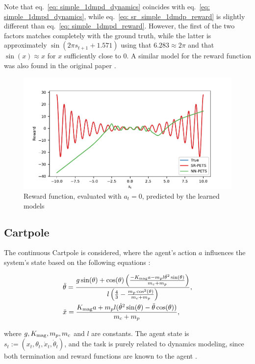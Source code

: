 \documentclass[11pt]{article}
\begin{document}
Note that eq.~\eqref{eq: simple_1dmpd_dynamics} coincides with eq.~\eqref{eq: simple_1dmpd_dynamics}, while eq.~\eqref{eq: sr_simple_1dmdp_reward} is slightly different than eq.~\eqref{eq: simple_1dmpd_reward}. However, the first of the two factors matches completely with the ground truth, while the latter is approximately $\sin(2\pi s_{t+1} + 1.571)$ using that $6.283\approx 2\pi$ and that $\sin(x) \approx x$ for $x$ sufficiently close to $0$. A similar model for the reward function was also found in the original paper \cite{kamienny2022symbolic}.

\begin{figure}
	\centering
	\includegraphics{simple1dmdp_pets.pdf}
	\caption{Reward function, evaluated with $a_t=0$, predicted by the learned models}
	\label{fig: simple_1dmdp}
\end{figure}

\subsection{Cartpole}
The continuous Cartpole \cite{brockman2016openai, todorov2012mujoco} is considered, where the agent's action $a$ influences the system's state based on the following equations \cite{florian2007correct}:

\begin{align}
	&\ddot{\theta} = \frac{g\sin(\theta) + \cos(\theta)\left(\frac{-K_{\rm mag} a - m_p l \dot{\theta}^2\sin(\theta)}{m_c + m_p}\right)}{l\left(\frac{4}{3} - \frac{m_p\cos^2(\theta)}{m_c+m_p}\right)}, \label{eq: cartpole_theta}\\
	& \ddot{x} = \frac{K_{\rm mag} a + m_pl(\dot{\theta}^2\sin(\theta) - \ddot{\theta}\cos(\theta))}{m_c + m_p} \label{eq: cartpole_x},
\end{align}

where $g,K_{\rm mag}, m_p, m_c$ and $l$ are constants. The agent state is $s_t := (x_t, \theta_t, \dot{x}_t, \dot{\theta}_t)$, and the task is purely related to dynamics modeling, since both termination and reward functions are known to the agent \cite{pineda2021mbrl, chua2018deep}. 
\end{document}
